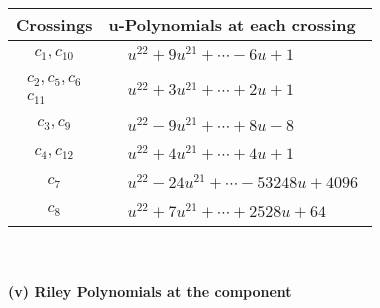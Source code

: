 \documentclass[1p]{elsarticle_modified}
\theoremstyle{definition}
\begin{document}
\begin{tabular}{m{50pt}|m{274pt}}
Crossings & \hspace{64pt}u-Polynomials at each crossing \\
\hline $$\begin{aligned}c_{1},c_{10}\end{aligned}$$&$\begin{aligned}
&u^{22}+9 u^{21}+\cdots-6 u+1
\end{aligned}$\\
\hline $$\begin{aligned}c_{2},c_{5},c_{6}\\c_{11}\end{aligned}$$&$\begin{aligned}
&u^{22}+3 u^{21}+\cdots+2 u+1
\end{aligned}$\\
\hline $$\begin{aligned}c_{3},c_{9}\end{aligned}$$&$\begin{aligned}
&u^{22}-9 u^{21}+\cdots+8 u-8
\end{aligned}$\\
\hline $$\begin{aligned}c_{4},c_{12}\end{aligned}$$&$\begin{aligned}
&u^{22}+4 u^{21}+\cdots+4 u+1
\end{aligned}$\\
\hline $$\begin{aligned}c_{7}\end{aligned}$$&$\begin{aligned}
&u^{22}-24 u^{21}+\cdots-53248 u+4096
\end{aligned}$\\
\hline $$\begin{aligned}c_{8}\end{aligned}$$&$\begin{aligned}
&u^{22}+7 u^{21}+\cdots+2528 u+64
\end{aligned}$\\
\hline
\end{tabular}\\~\\
\newpage\renewcommand{\arraystretch}{1}
\flushleft \textbf{(v) Riley Polynomials at the component}\newline \\
\end{document}
